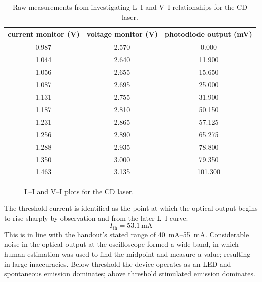 \documentclass[a4paper, 10pt]{article}
\newcommand{\scriptfigure}[2]{
\begin{figure}
  \centering
  
  \caption{#2}
  \label{fig:#1}
\end{figure}
}
\begin{document}
\begin{table}[h]
    \centering
    \begin{tabular}{ccc}
        \toprule
        current monitor (V) & voltage monitor (V) & photodiode output (mV) \\
        \midrule
        0.987               & 2.570               & 0.000                  \\
        1.044               & 2.640               & 11.900                 \\
        1.056               & 2.655               & 15.650                 \\
        1.087               & 2.695               & 25.000                 \\
        1.131               & 2.755               & 31.900                 \\
        1.187               & 2.810               & 50.150                 \\
        1.231               & 2.865               & 57.125                 \\
        1.256               & 2.890               & 65.275                 \\
        1.288               & 2.935               & 78.800                 \\
        1.350               & 3.000               & 79.350                 \\
        1.463               & 3.135               & 101.300                \\
        \bottomrule
    \end{tabular}
    \caption{Raw measurements from investigating L--I and V--I relationships for the CD laser.}
    \label{tab:cd-data}
\end{table}

\scriptfigure{cd}{L--I and V--I plots for the CD laser.}

The threshold current is identified as the point at which the optical output begins to rise sharply by observation and from the later L--I curve:
\begin{equation*}
    I_\mathrm{th} = \qty{53.1}{\milli\ampere}
\end{equation*}
This is in line with the handout's stated range of \SIrange{40}{55}{\milli\ampere}. Considerable noise in the optical output at the oscilloscope formed a wide band, in which human estimation was used to find the midpoint and measure a value; resulting in large inaccuracies. Below threshold the device operates as an LED and spontaneous emission dominates; above threshold stimulated emission dominates.
\end{document}
